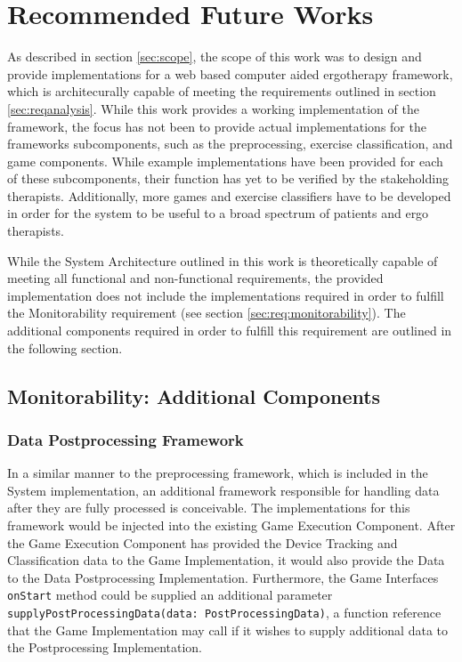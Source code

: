 \chapter{Recommended Future Works}
\label{sec:future}
As described in section \ref{sec:scope}, the scope of this work was to design and provide implementations for a web based computer aided ergotherapy framework, which is architecurally capable of meeting the requirements outlined in section \ref{sec:reqanalysis}. While this work provides a working implementation of the framework, the focus has not been to provide actual implementations for the frameworks subcomponents, such as the preprocessing, exercise classification, and game components. While example implementations have been provided for each of these subcomponents, their function has yet to be verified by the stakeholding therapists. Additionally, more games and exercise classifiers have to be developed in order for the system to be useful to a broad spectrum of patients and ergo therapists. 

While the System Architecture outlined in this work is theoretically capable of meeting all functional and non-functional requirements, the provided implementation does not include the implementations required in order to fulfill the Monitorability requirement (see section \ref{sec:req:monitorability}). The additional components required in order to fulfill this requirement are outlined in the following section.
\section{Monitorability: Additional Components}
\subsection{Data Postprocessing Framework}
\label{sec:future:data-postprocessing-framework}
In a similar manner to the preprocessing framework, which is included in the System implementation, an additional framework responsible for handling data after they are fully processed is conceivable. The implementations for this framework would be injected into the existing Game Execution Component. After the Game Execution Component has provided the Device Tracking and Classification data to the Game Implementation, it would also provide the Data to the Data Postprocessing Implementation. Furthermore, the Game Interfaces \texttt{onStart} method could be supplied an additional parameter \texttt{supplyPostProcessingData(data: PostProcessingData)}, a function reference that the Game Implementation may call if it wishes to supply additional data to the Postprocessing Implementation.

